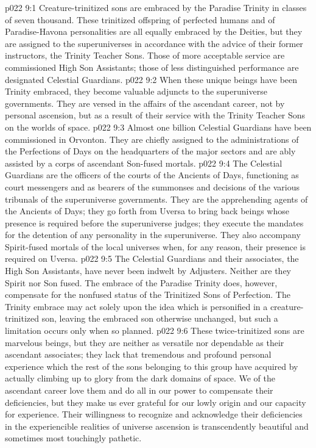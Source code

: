 \vs p022 9:1 Creature\hyp{}trinitized sons are embraced by the Paradise Trinity in classes of seven thousand. These trinitized offspring of perfected humans and of Paradise\hyp{}Havona personalities are all equally embraced by the Deities, but they are assigned to the superuniverses in accordance with the advice of their former instructors, the Trinity Teacher Sons. Those of more acceptable service are commissioned High Son Assistants; those of less distinguished performance are designated Celestial Guardians.
\vs p022 9:2 When these unique beings have been Trinity embraced, they become valuable adjuncts to the superuniverse governments. They are versed in the affairs of the ascendant career, not by personal ascension, but as a result of their service with the Trinity Teacher Sons on the worlds of space.
\pc \vs p022 9:3 Almost one billion Celestial Guardians have been commissioned in Orvonton. They are chiefly assigned to the administrations of the Perfections of Days on the headquarters of the major sectors and are ably assisted by a corps of ascendant Son\hyp{}fused mortals.
\vs p022 9:4 The Celestial Guardians are the officers of the courts of the Ancients of Days, functioning as court messengers and as bearers of the summonses and decisions of the various tribunals of the superuniverse governments. They are the apprehending agents of the Ancients of Days; they go forth from Uversa to bring back beings whose presence is required before the superuniverse judges; they execute the mandates for the detention of any personality in the superuniverse. They also accompany Spirit\hyp{}fused mortals of the local universes when, for any reason, their presence is required on Uversa.
\pc \vs p022 9:5 The Celestial Guardians and their associates, the High Son Assistants, have never been indwelt by Adjusters. Neither are they Spirit nor Son fused. The embrace of the Paradise Trinity does, however, compensate for the nonfused status of the Trinitized Sons of Perfection. The Trinity embrace may act solely upon the idea which is personified in a creature\hyp{}trinitized son, leaving the embraced son otherwise unchanged, but such a limitation occurs only when so planned.\plusone
\vs p022 9:6 These twice\hyp{}trinitized sons are marvelous beings, but they are neither as versatile nor dependable as their ascendant associates; they lack that tremendous and profound personal experience which the rest of the sons belonging to this group have acquired by actually climbing up to glory from the dark domains of space. We of the ascendant career love them and do all in our power to compensate their deficiencies, but they make us ever grateful for our lowly origin and our capacity for experience. Their willingness to recognize and acknowledge their deficiencies in the experiencible realities of universe ascension is transcendently beautiful and sometimes most touchingly pathetic.
